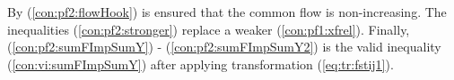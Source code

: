 By (\ref{con:pf2:flowHook}) is ensured that the common flow is non-increasing.
The inequalities (\ref{con:pf2:stronger}) replace a weaker (\ref{con:pf1:xfrel}).
Finally, (\ref{con:pf2:sumFImpSumY}) - (\ref{con:pf2:sumFImpSumY2}) is the valid inequality (\ref{con:vi:sumFImpSumY}) after applying transformation (\ref{eq:tr:fstij1}).
 




